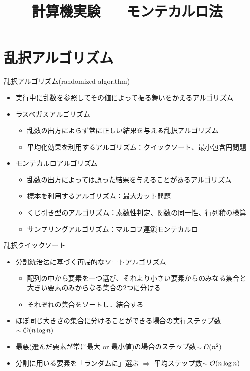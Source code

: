 \documentclass[dvipdfmx]{beamer}
\title{計算機実験 --- モンテカルロ法}
\begin{document}

\begin{frame}
  \titlepage
  \tableofcontents
\end{frame}

\section{乱択アルゴリズム}

\begin{frame}[t,fragile]{乱択アルゴリズム(randomized algorithm)}
  \begin{itemize}
  \item 実行中に乱数を参照してその値によって振る舞いをかえるアルゴリズム
  \item ラスベガスアルゴリズム
    \begin{itemize}
    \item 乱数の出方によらず常に正しい結果を与える乱択アルゴリズム
    \item 平均化効果を利用するアルゴリズム：クイックソート、最小包含円問題
    \end{itemize}
  \item モンテカルロアルゴリズム
    \begin{itemize}
    \item 乱数の出方によっては誤った結果を与えることがあるアルゴリズム
    \item 標本を利用するアルゴリズム：最大カット問題
    \item くじ引き型のアルゴリズム：素数性判定、関数の同一性、行列積の検算
    \item サンプリングアルゴリズム：マルコフ連鎖モンテカルロ
    \end{itemize}
  \end{itemize}
\end{frame}

\begin{frame}[t,fragile]{乱択クイックソート}
  \begin{itemize}
    \setlength{\itemsep}{1em}
  \item 分割統治法に基づく再帰的なソートアルゴリズム
    \begin{itemize}
      \item 配列の中から要素を一つ選び、それより小さい要素からのみなる集合と大きい要素のみからなる集合の2つに分ける
      \item それぞれの集合をソートし、結合する
    \end{itemize}
    \item ほぼ同じ大きさの集合に分けることができる場合の実行ステップ数$\sim {\cal O}(n \log n)$
    \item 最悪(選んだ要素が常に最大 or 最小値)の場合のステップ数$\sim {\cal O}(n^2)$
    \item 分割に用いる要素を「ランダムに」選ぶ $\Rightarrow$ 平均ステップ数$\sim {\cal O}(n \log n)$
  \end{itemize}
\end{frame}
\end{document}
